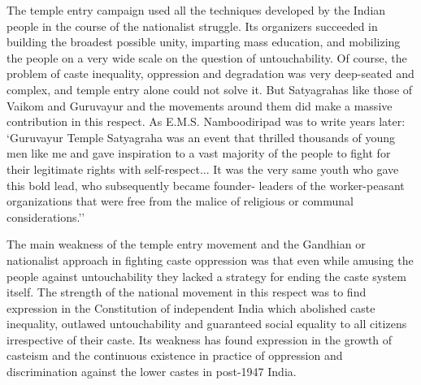 The temple entry campaign used all the techniques developed by the Indian people in the course of the nationalist struggle. Its organizers succeeded in building the broadest possible unity, imparting mass education, and mobilizing the people on a very wide scale on the question of untouchability. Of course, the problem of caste inequality, oppression and degradation was very deep-seated and complex, and temple entry alone could not solve it. But Satyagrahas like those of Vaikom and Guruvayur and the movements around them did make a massive contribution in this respect. As E.M.S. Namboodiripad was to write years later: `Guruvayur Temple Satyagraha was an event that thrilled thousands of young men like me and gave inspiration to a vast majority of the people to fight for their legitimate rights with self-respect... It was the very same youth who gave this bold lead, who subsequently became founder- leaders of the worker-peasant organizations that were free from the malice of religious or communal considerations.''

The main weakness of the temple entry movement and the Gandhian or nationalist approach in fighting caste oppression was that even while amusing the people against untouchability they lacked a strategy for ending the caste system itself. The strength of the national movement in this respect was to find expression in the Constitution of independent India which abolished caste inequality, outlawed untouchability and guaranteed social equality to all citizens irrespective of their caste. Its weakness has found expression in the growth of casteism and the continuous existence in practice of oppression and discrimination against the lower castes in post-1947 India.
